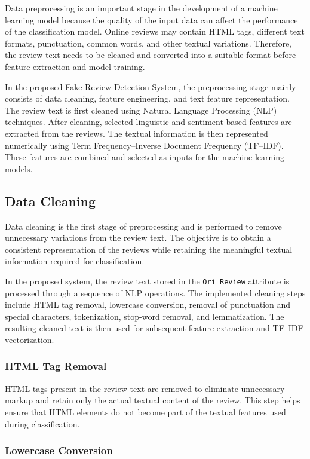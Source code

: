\documentclass[12pt,a4paper]{report}
\begin{document}
Data preprocessing is an important stage in the development of a machine learning model because the quality of the input data can affect the performance of the classification model. Online reviews may contain HTML tags, different text formats, punctuation, common words, and other textual variations. Therefore, the review text needs to be cleaned and converted into a suitable format before feature extraction and model training.

In the proposed Fake Review Detection System, the preprocessing stage mainly consists of data cleaning, feature engineering, and text feature representation. The review text is first cleaned using Natural Language Processing (NLP) techniques. After cleaning, selected linguistic and sentiment-based features are extracted from the reviews. The textual information is then represented numerically using Term Frequency--Inverse Document Frequency (TF--IDF). These features are combined and selected as inputs for the machine learning models.

\subsection{Data Cleaning}

Data cleaning is the first stage of preprocessing and is performed to remove unnecessary variations from the review text. The objective is to obtain a consistent representation of the reviews while retaining the meaningful textual information required for classification.

In the proposed system, the review text stored in the \texttt{Ori\_Review} attribute is processed through a sequence of NLP operations. The implemented cleaning steps include HTML tag removal, lowercase conversion, removal of punctuation and special characters, tokenization, stop-word removal, and lemmatization. The resulting cleaned text is then used for subsequent feature extraction and TF--IDF vectorization.

\subsubsection*{HTML Tag Removal}

HTML tags present in the review text are removed to eliminate unnecessary markup and retain only the actual textual content of the review. This step helps ensure that HTML elements do not become part of the textual features used during classification.

\subsubsection*{Lowercase Conversion}
\end{document}
